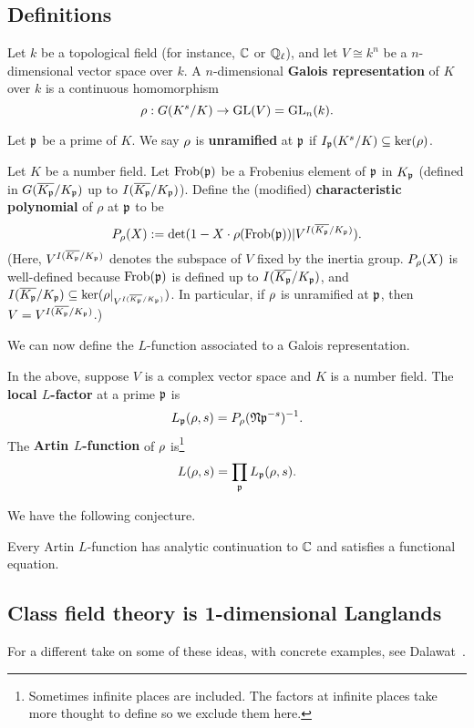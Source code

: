\subsection{Definitions}
\begin{df}
Let $k$ be a topological field (for instance, $\mathbb{C}$ or $\mathbb{Q}_{\ell}$), and let $V\cong k^n$ be a $n$-dimensional vector space over $k$. A $n$-dimensional \textbf{Galois representation} of $K$ over $k$ is a continuous homomorphism 
\[\rho:G(K^s/K)\to \operatorname{GL}(V)=\operatorname{GL}_n(k).\]

Let $\mathfrak{p}$ be a prime of $K$. We say $\rho$ is \textbf{unramified} at $\mathfrak{p}$ if $I_{\mathfrak{p}}(K^s/K)\subseteq \ker(\rho)$.

Let $K$ be a number field. Let $\operatorname{Frob}(\mathfrak{p})$ be a Frobenius element of $\mathfrak{p}$ in $K_{\mathfrak{p}}$ (defined in $G(\overline{K_{\mathfrak{p}}}/K_{\mathfrak{p}})$ up to $I(\overline{K_{\mathfrak{p}}}/K_{\mathfrak{p}})$). Define the (modified) \textbf{characteristic polynomial} of $\rho$ at $\mathfrak{p}$ to be
\[
P_{\rho}(X):=\det(1-X\cdot \rho(\operatorname{Frob}(\mathfrak{p}))|V^{I(\overline{K_{\mathfrak{p}}}/K_{\mathfrak{p}})}).
\]
(Here, $V^{I(\overline{K_{\mathfrak{p}}}/K_{\mathfrak{p}})}$ denotes the subspace of $V$ fixed by the inertia group. $P_{\rho}(X)$ is well-defined because $\operatorname{Frob}(\mathfrak{p})$ is defined up to $I(\overline{K_{\mathfrak{p}}}/K_{\mathfrak{p}})$, and $I(\overline{K_{\mathfrak{p}}}/K_{\mathfrak{p}})\subseteq \ker(\rho|_{V^{I(\overline{K_{\mathfrak{p}}}/K_{\mathfrak{p}})}})$. In particular, if $\rho$ is unramified at $\mathfrak{p}$, then $V=V^{I(\overline{K_{\mathfrak{p}}}/K_{\mathfrak{p}})}$.)
\end{df}
We can now define the $L$-function associated to a Galois representation.
\begin{df}
In the above, suppose $V$ is a complex vector space and $K$ is a number field. The \textbf{local $L$-factor} at a prime $\mathfrak{p}$ is
\[
L_{\mathfrak{p}}(\rho,s)=P_{\rho}(\mathfrak{N}\mathfrak{p}^{-s})^{-1}.
\]
The \textbf{Artin $L$-function} of $\rho$ is\footnote{Sometimes infinite places are included. The factors at infinite places take more thought to define so we exclude them here.}
\[
L(\rho,s)=\prod_{\mathfrak{p}} L_{\mathfrak{p}}(\rho,s).
\]
\end{df}
We have the following conjecture.
\begin{conj}
Every Artin $L$-function has analytic continuation to $\mathbb{C}$ and satisfies a functional equation.
\end{conj}
\subsection{Class field theory is 1-dimensional Langlands}
For a different take on some of these ideas, with concrete examples, see Dalawat~\cite{Da11}.
